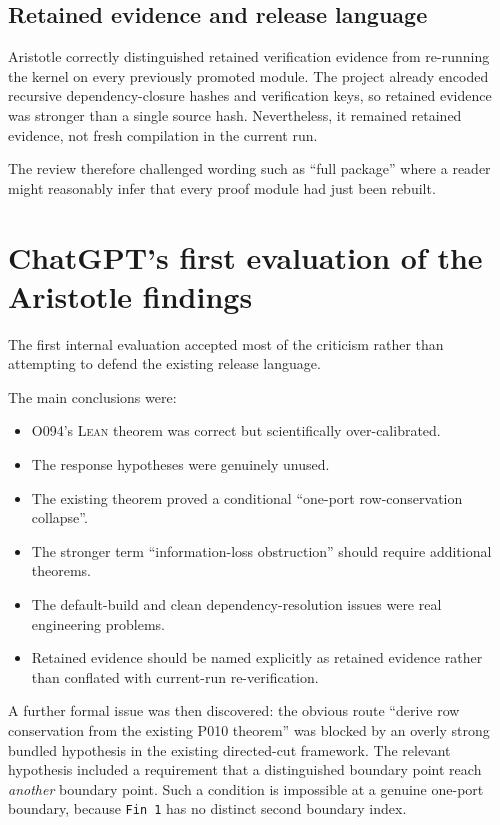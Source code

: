 \documentclass[11pt,a4paper]{article}
\newcommand{\Lean}{\textsc{Lean}}
\begin{document}
\subsection{Retained evidence and release language}

Aristotle correctly distinguished retained verification evidence from re-running the kernel on every previously promoted module. The project already encoded recursive dependency-closure hashes and verification keys, so retained evidence was stronger than a single source hash. Nevertheless, it remained retained evidence, not fresh compilation in the current run.

The review therefore challenged wording such as ``full package'' where a reader might reasonably infer that every proof module had just been rebuilt.

\section{ChatGPT's first evaluation of the Aristotle findings}

The first internal evaluation accepted most of the criticism rather than attempting to defend the existing release language.

The main conclusions were:

\begin{itemize}
  \item O094's \Lean{} theorem was correct but scientifically over-calibrated.
  \item The response hypotheses were genuinely unused.
  \item The existing theorem proved a conditional ``one-port row-conservation collapse''.
  \item The stronger term ``information-loss obstruction'' should require additional theorems.
  \item The default-build and clean dependency-resolution issues were real engineering problems.
  \item Retained evidence should be named explicitly as retained evidence rather than conflated with current-run re-verification.
\end{itemize}

A further formal issue was then discovered: the obvious route ``derive row conservation from the existing P010 theorem'' was blocked by an overly strong bundled hypothesis in the existing directed-cut framework. The relevant hypothesis included a requirement that a distinguished boundary point reach \emph{another} boundary point. Such a condition is impossible at a genuine one-port boundary, because \texttt{Fin 1} has no distinct second boundary index.
\end{document}
